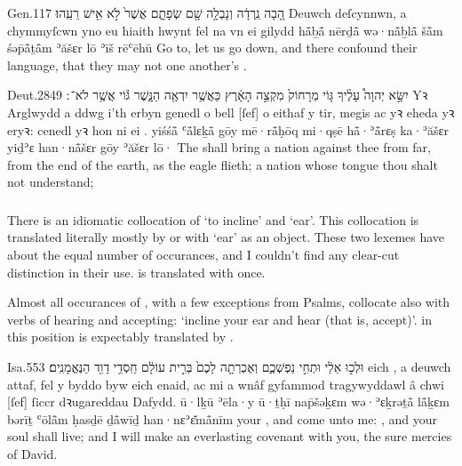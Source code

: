 \begin{example}{Gen.}{11}{7}{}{}
	\quoling
	{הָ֚בָה נֵֽרְדָ֔ה וְנָבְלָ֥ה שָׁ֖ם שְׂפָתָ֑ם אֲשֶׁר֙ לֹ֣א  אִ֖ישׁ  רֵעֵֽהוּ׃}
	{Deuwch deſcynnwn, a chymmyſcwn yno eu hiaith hwynt fel na  vn  ei gilydd}
	{hå̄ḇå̄ nērḏå̄ wə·nå̄ḇlå̄ šå̄m śəp̄å̄ṯå̄m ʾăšɛr lō  ʾīš  rēʿēhū}
	{Go to, let us go down, and there confound their language, that they may not  one another’s .}
\end{example}

\begin{example}{Deut.}{28}{49}{}{}
	\quoling
	{יִשָּׂ֣א יְהוָה֩ עָלֶ֨יךָ גּ֤וֹי מֵרָחוֹק֙ מִקְצֵ֣ה הָאָ֔רֶץ כַּאֲשֶׁ֥ר יִדְאֶ֖ה הַנָּ֑שֶׁר גּ֕וֹי אֲשֶׁ֥ר לֹא־ ׃}
	{Yꝛ Arglwydd a ddwg i’th erbyn genedl o bell [ſef] o eithaf y tir, megis ac yꝛ eheda yꝛ eryꝛ: cenedl yꝛ hon ni  ei .}
	{yiśśå̄ {\YHWH} ʿå̄lɛḵå̄ gōy mē·rå̄ḥōq mi·qṣē hå̄·ʾå̄rɛṣ ka·ʾăšɛr yiḏʾɛ han·nå̄šɛr gōy ʾăšɛr lō· }
	{The {\LORD} shall bring a nation against thee from far, from the end of the earth,  as the eagle flieth; a nation whose tongue thou shalt not understand;}
\end{example}



\subsubsection{}


\begin{paper}
	There is an idiomatic collocation of  ‘to incline’ and  ‘ear’. This collocation is translated literally mostly by  or  with  ‘ear’ as an object. These two lexemes have about the equal number of occurances, and I couldn’t find any clear-cut distinction in their use.  is translated with  once.

	Almost all occurances of , with a few exceptions from Psalms, collocate also with verbs of hearing and accepting: ‘incline your ear and hear (that is, accept)’.  in this position is expectably translated by .
\end{paper}

\begin{example}{Isa.}{55}{3}{}{}
	\quoling
	{  וּלְכ֣וּ אֵלַ֔י  וּתְחִ֣י נַפְשְׁכֶ֑ם וְאֶכְרְתָ֤ה לָכֶם֙ בְּרִ֣ית עוֹלָ֔ם חַֽסְדֵ֥י דָוִ֖ד הַנֶּאֱמָנִֽים׃}
	{ eich , a deuwch attaf,  fel y byddo byw eich enaid, ac mi a wnâf gyfammod tragywyddawl â chwi [ſef] ſiccr dꝛugareddau Dafydd.}
	{  ū·lḵū ʾēla·y  ū·ṯḥī nap̄šəḵɛm wə·ʾɛḵrəṯå̄ lå̄ḵɛm bərīṯ ʿōlå̄m ḥasḏē ḏå̄wīḏ han·nɛʾɛ̆må̄nīm}
	{ your , and come unto me: , and your soul shall live; and I will make an everlasting covenant with you,  the sure mercies of David.}
\end{example}

